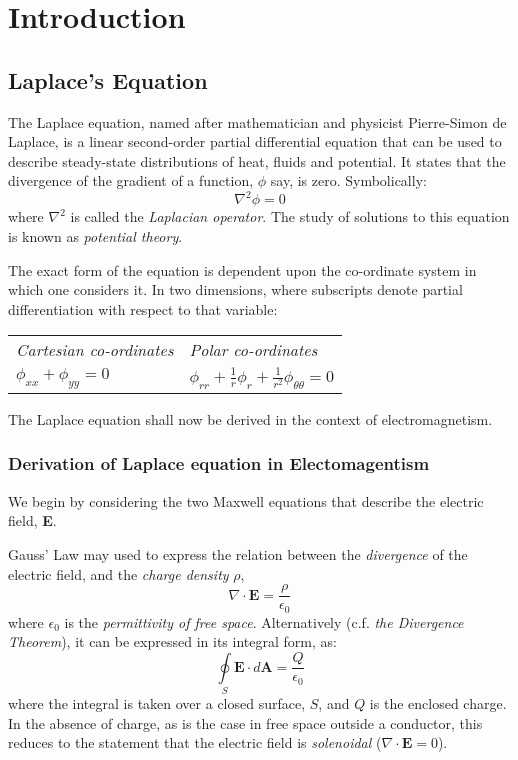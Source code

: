 \documentclass[12pt, a4paper]{article}
\newcommand{\be}{\begin{equation}}
\newcommand{\ee}{\end{equation}}
\begin{document}
\section{Introduction}
\subsection{Laplace's Equation}

The Laplace equation, named after mathematician and physicist Pierre-Simon de Laplace,
is a linear second-order partial differential equation that can be used to describe
steady-state distributions of heat, fluids and potential. It states that the divergence
of the gradient of a function, $\phi$ say, is zero. Symbolically:
%
\be
\nabla ^2 \phi = 0
\ee
%
where $\nabla^2$ is called the \emph{Laplacian operator}. The study of solutions to
this equation is known as \emph{potential theory}.

The exact form of the equation is dependent upon the co-ordinate system in which one
considers it. In two dimensions, where subscripts denote partial differentiation with
respect to that variable:

\begin{center}
\begin{tabularx}{0.6\textwidth}{|Y|Y|}
\hline
\emph{Cartesian co-ordinates} & \emph{Polar co-ordinates} \\
$\phi_{xx}+\phi_{yy}=0$ & $\phi_{rr}+\frac{1}{r}\phi_r+\frac{1}{r^2}\phi_{\theta \theta}=0$ \\
\hline
\end{tabularx}
\end{center}

The Laplace equation shall now be derived in the context of electromagnetism.

\subsubsection{Derivation of Laplace equation in Electomagentism}
We begin by considering the two Maxwell equations that describe the electric field,
\textbf{E}.

Gauss' Law may used to express the relation between the \emph{divergence} of the
electric field, and the \emph{charge density} $\rho$,
%
\be
\nabla \cdot \bm{E} = \frac{\rho}{\epsilon_0}
\ee
%
where $\epsilon_0$ is the \emph{permittivity of free space}. Alternatively (c.f.
\emph{the Divergence Theorem}), it can be expressed in its integral form, as:
%
\be
\oint \limits_S \bm{E} \cdot d\bm{A} = \frac{Q}{\epsilon_0}
\ee
%
where the integral is taken over a closed surface, $S$, and $Q$ is the enclosed charge.
In the absence of charge, as is the case in free space outside a conductor, this
reduces to the statement that the electric field is \emph{solenoidal}
($\nabla \cdot \bm{E}=0$).
\end{document}
